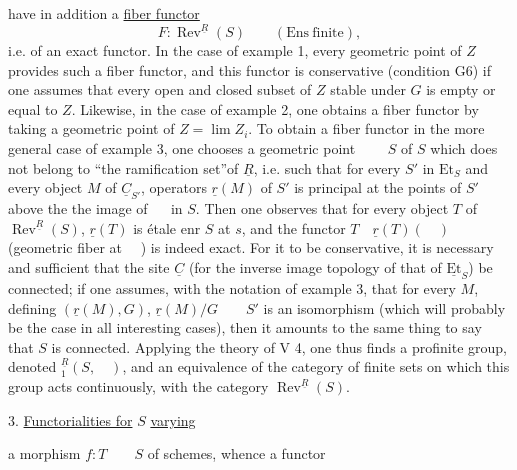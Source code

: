 %
have in addition a \uline{fiber functor}
\[
F:\operatorname{Rev}^{\underline{R}}(S)\qquad(\mathrm{Ens\ finite}),
\]
i.e. of an exact functor. In the case of example 1, every geometric point of $Z$ provides such a fiber functor, and this functor is conservative (condition G6) if one assumes that every open and closed subset of $Z$ stable under $G$ is empty or equal to $Z$. Likewise, in the case of example 2, one obtains a  fiber functor by taking a geometric point of $Z=\lim Z_i$. To obtain a fiber functor in the more general case of example 3, one chooses a geometric point $\qquad S$ of $S$  which does not belong to ``the ramification set''of $\underline{R}$, i.e. such that for every $S'$ in $\mathrm{Et}_S$ and every object $M$ of $\underline{C}_{S'}$,     operators $\underline{r}(M)$  of $S'$ is principal at the points of $S'$above the the image  of $\quad$ in $S$. Then   one observes that for every object $T$ of $\operatorname{Rev}^{\underline{R}}(S)$, $\underline{r}(T)$ is étale enr $S$ at $s$, and the functor $T\quad\underline{r}(T)(\quad)$ (geometric fiber at $\quad$) is indeed exact. For it to be conservative, it is necessary and sufficient that the site $\underline{C}$ (for the inverse image topology of that of $\underline{\mathrm{Et}}_S$) be connected;  if one assumes, with the notation of example 3, that for every $M$, defining $(\underline{r}(M),G)$, $\underline{r}(M)/G\qquad S'$ is an isomorphism (which will probably be the case in all interesting cases), then it amounts to the same thing to say that $S$ is connected. Applying the theory of V 4, one thus finds a profinite group, denoted ${}^{\underline{R}}_1(S,\quad)$,  and an equivalence of the category of finite sets on which this group acts continuously, with the category $\operatorname{Rev}^{\underline{R}}(S)$.

3. \uline{Functorialities for} $S$  \uline{varying}

 a morphism $f:T\qquad S$ of schemes, whence a functor
